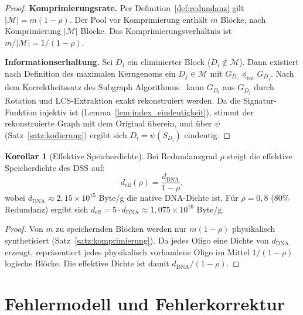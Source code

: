 ﻿\documentclass[a4paper,12pt]{article}
\theoremstyle{definition}
\newtheorem{korollar}{Korollar}
\begin{document}
\begin{proof}
    \textbf{Komprimierungsrate.}
    Per Definition~\ref{def:redundanz} gilt $|\mathcal{M}| = m(1-\rho)$.
    Der Pool vor Komprimierung enth\"{a}lt $m$ Bl\"{o}cke, nach Komprimierung
    $|\mathcal{M}|$ Bl\"{o}cke. Das Komprimierungsverh\"{a}ltnis ist
    $m / |\mathcal{M}| = 1/(1-\rho)$.

    \textbf{Informationserhaltung.}
    Sei $D_i$ ein eliminierter Block ($D_i \notin \mathcal{M}$). Dann
    existiert nach Definition des maximalen Kerngenoms ein $D_j \in \mathcal{M}$
    mit $G_{D_i} \preceq_{\mathrm{rot}} G_{D_j}$.
    Nach dem Korrektheitssatz des Subgraph Algorithmus~\cite{epp2026}
    kann $G_{D_i}$ aus $G_{D_j}$ durch Rotation und LCS-Extraktion exakt
    rekonstruiert werden. Da die Signatur-Funktion injektiv ist
    (Lemma~\ref{lem:index_eindeutigkeit}), stimmt der rekonstruierte
    Graph mit dem Original \"{u}berein, und \"{u}ber $\psi$ (Satz~\ref{satz:kodierung})
    ergibt sich $D_i = \psi(S_{D_i})$ eindeutig. 
\end{proof}

\begin{korollar}[Effektive Speicherdichte]
    \label{kor:dichte}
    Bei Redundanzgrad $\rho$ steigt die effektive Speicherdichte des DSS auf:
    \[
        d_{\mathrm{eff}}(\rho) = \frac{d_{\mathrm{DNA}}}{1 - \rho},
    \]
    wobei $d_{\mathrm{DNA}} \approx 2{,}15 \times 10^{15}$ Byte/g die
    native DNA-Dichte ist.
    F\"{u}r $\rho = 0{,}8$ (80\% Redundanz) ergibt sich
    $d_{\mathrm{eff}} = 5 \cdot d_{\mathrm{DNA}} \approx
    1{,}075 \times 10^{16}$ Byte/g.
\end{korollar}

\begin{proof}
    Von $m$ zu speichernden Bl\"{o}cken werden nur $m(1-\rho)$ physikalisch
    synthetisiert (Satz~\ref{satz:komprimierung}). Da jedes Oligo eine
    Dichte von $d_{\mathrm{DNA}}$ erzeugt, repr\"{a}sentiert jedes
    physikalisch vorhandene Oligo im Mittel $1/(1-\rho)$ logische Bl\"{o}cke.
    Die effektive Dichte ist damit $d_{\mathrm{DNA}} / (1-\rho)$. 
\end{proof}

\section{Fehlermodell und Fehlerkorrektur}
\label{sec:fehler}
\end{document}
